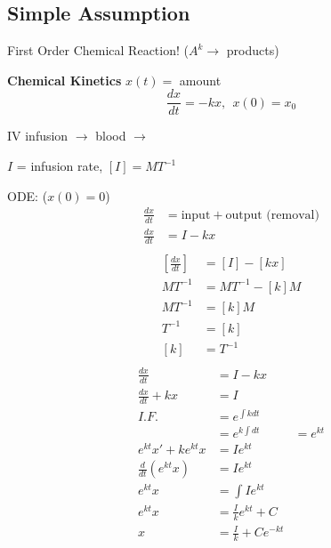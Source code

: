 \documentclass[
	date={September 9{,} 2024}
]{math486notes}
\begin{document}
\subsection{Simple Assumption}\label{subsec:simple-assumption}
First Order Chemical Reaction!
($A^{k} \rightarrow $ products)

\textbf{Chemical Kinetics}
$x(t) = $ amount
\[ \frac{dx}{dt} = -kx,\ \ x(0) = x_{0} \]

\begin{example}
	IV infusion $\rightarrow$ blood $\rightarrow$

	$I$ = infusion rate, $[I] = MT^{-1}$

	ODE: ($x(0) = 0$)
	\begin{equation*}
	\begin{aligned}
		\frac{dx}{dt} &= \mbox{input} + \mbox{output (removal)}\\
		\frac{dx}{dt} &= I - kx\\
	\end{aligned}
	\end{equation*}
	\begin{equation*}
	\begin{aligned}
		\left[ \frac{dx}{dt} \right] &= [I] - [kx]\\
		MT^{-1} &= MT^{-1} - [k]M\\
		MT^{-1} &= [k]M\\
		T^{-1} &= [k]\\
		[k] &= T^{-1}\\
	\end{aligned}
	\end{equation*}
	\begin{equation*}
	\begin{aligned}
		\frac{dx}{dt} &= I - kx\\
		\frac{dx}{dt} + kx &= I\\
		I.F. &= e^{\int k dt}\\
			 &= e^{k\int dt}
			 &= e^{kt}\\
		e^{kt}x' + ke^{kt}x &= Ie^{kt}\\
		\frac{d}{dt}\left( e^{kt}x \right) &= Ie^{kt}\\
		e^{kt}x &= \int Ie^{kt}\\
		e^{kt}x &= \frac{I}{k}e^{kt} + C\\
		x &= \frac{I}{k} + Ce^{-kt}\\
	\end{aligned}
	\end{equation*}
	\begin{equation*}

\end{equation*}
\end{example}
\end{document}
